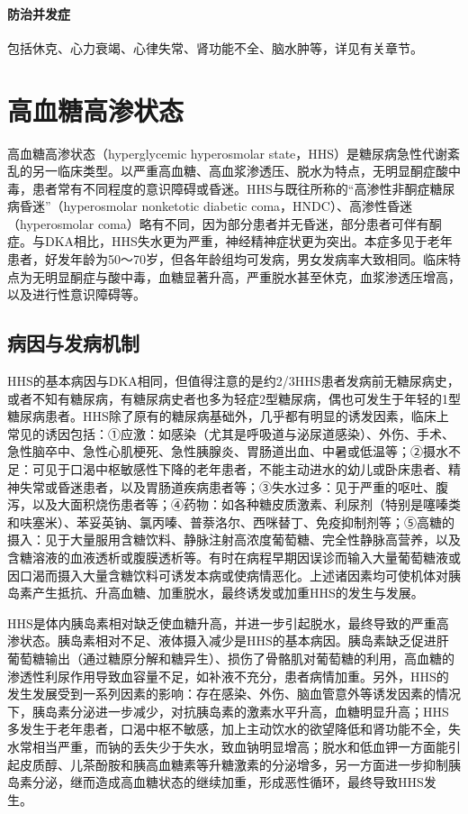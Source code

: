 \paragraph{防治并发症}

包括休克、心力衰竭、心律失常、肾功能不全、脑水肿等，详见有关章节。

\protect\hypertarget{text00122.html}{}{}

\section{高血糖高渗状态}

高血糖高渗状态（hyperglycemic hyperosmolar
state，HHS）是糖尿病急性代谢紊乱的另一临床类型。以严重高血糖、高血浆渗透压、脱水为特点，无明显酮症酸中毒，患者常有不同程度的意识障碍或昏迷。HHS与既往所称的“高渗性非酮症糖尿病昏迷”（hyperosmolar
nonketotic diabetic coma，HNDC）、高渗性昏迷（hyperosmolar
coma）略有不同，因为部分患者并无昏迷，部分患者可伴有酮症。与DKA相比，HHS失水更为严重，神经精神症状更为突出。本症多见于老年患者，好发年龄为50～70岁，但各年龄组均可发病，男女发病率大致相同。临床特点为无明显酮症与酸中毒，血糖显著升高，严重脱水甚至休克，血浆渗透压增高，以及进行性意识障碍等。

\subsection{病因与发病机制}

HHS的基本病因与DKA相同，但值得注意的是约2/3HHS患者发病前无糖尿病史，或者不知有糖尿病，有糖尿病史者也多为轻症2型糖尿病，偶也可发生于年轻的1型糖尿病患者。HHS除了原有的糖尿病基础外，几乎都有明显的诱发因素，临床上常见的诱因包括：①应激：如感染（尤其是呼吸道与泌尿道感染）、外伤、手术、急性脑卒中、急性心肌梗死、急性胰腺炎、胃肠道出血、中暑或低温等；②摄水不足：可见于口渴中枢敏感性下降的老年患者，不能主动进水的幼儿或卧床患者、精神失常或昏迷患者，以及胃肠道疾病患者等；③失水过多：见于严重的呕吐、腹泻，以及大面积烧伤患者等；④药物：如各种糖皮质激素、利尿剂（特别是噻嗪类和呋塞米）、苯妥英钠、氯丙嗪、普萘洛尔、西咪替丁、免疫抑制剂等；⑤高糖的摄入：见于大量服用含糖饮料、静脉注射高浓度葡萄糖、完全性静脉高营养，以及含糖溶液的血液透析或腹膜透析等。有时在病程早期因误诊而输入大量葡萄糖液或因口渴而摄入大量含糖饮料可诱发本病或使病情恶化。上述诸因素均可使机体对胰岛素产生抵抗、升高血糖、加重脱水，最终诱发或加重HHS的发生与发展。

HHS是体内胰岛素相对缺乏使血糖升高，并进一步引起脱水，最终导致的严重高渗状态。胰岛素相对不足、液体摄入减少是HHS的基本病因。胰岛素缺乏促进肝葡萄糖输出（通过糖原分解和糖异生）、损伤了骨骼肌对葡萄糖的利用，高血糖的渗透性利尿作用导致血容量不足，如补液不充分，患者病情加重。另外，HHS的发生发展受到一系列因素的影响：存在感染、外伤、脑血管意外等诱发因素的情况下，胰岛素分泌进一步减少，对抗胰岛素的激素水平升高，血糖明显升高；HHS多发生于老年患者，口渴中枢不敏感，加上主动饮水的欲望降低和肾功能不全，失水常相当严重，而钠的丢失少于失水，致血钠明显增高；脱水和低血钾一方面能引起皮质醇、儿茶酚胺和胰高血糖素等升糖激素的分泌增多，另一方面进一步抑制胰岛素分泌，继而造成高血糖状态的继续加重，形成恶性循环，最终导致HHS发生。


